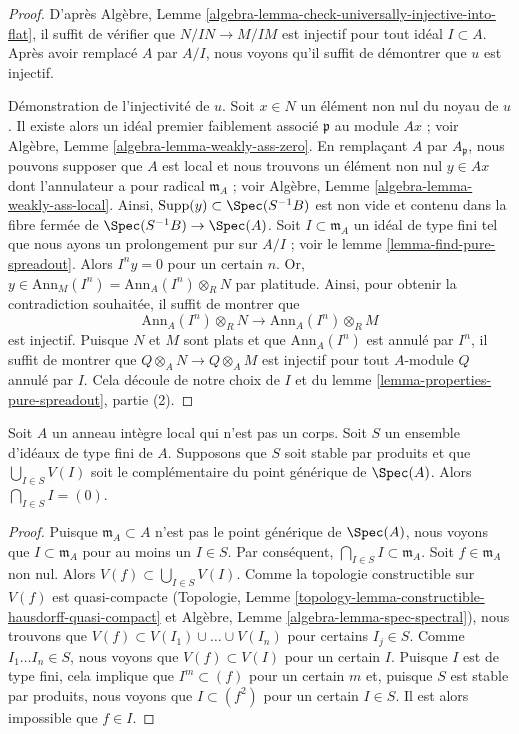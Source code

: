 \begin{proof}
D'après Algèbre, Lemme \ref{algebra-lemma-check-universally-injective-into-flat},
il suffit de vérifier que $N/IN \to M/IM$ est injectif pour tout
idéal $I \subset A$. Après avoir remplacé $A$ par $A/I$, nous voyons qu'il suffit
de démontrer que $u$ est injectif.

\medskip\noindent
Démonstration de l'injectivité de $u$. Soit $x \in N$ un élément non nul du
noyau de $u$. Il existe alors un idéal premier faiblement associé $\mathfrak p$
au module $Ax$ ; voir Algèbre, Lemme \ref{algebra-lemma-weakly-ass-zero}.
En remplaçant $A$ par $A_\mathfrak p$, nous pouvons supposer que $A$ est local et
nous trouvons un élément non nul $y \in Ax$ dont l'annulateur a pour radical
$\mathfrak m_A$ ; voir
Algèbre, Lemme \ref{algebra-lemma-weakly-ass-local}.
Ainsi, $\text{Supp}(y) \subset \Spec(S^{-1}B)$ est non vide et
contenu dans la fibre fermée de $\Spec(S^{-1}B) \to \Spec(A)$.
Soit $I \subset \mathfrak m_A$ un
idéal de type fini tel que nous ayons un prolongement pur sur $A/I$ ; voir le
lemme \ref{lemma-find-pure-spreadout}. Alors $I^n y = 0$ pour un certain $n$. Or,
$y \in \text{Ann}_M(I^n) = \text{Ann}_A(I^n) \otimes_R N$ par platitude.
Ainsi, pour obtenir la contradiction souhaitée, il suffit de montrer que
$$
\text{Ann}_A(I^n) \otimes_R N
\longrightarrow
\text{Ann}_A(I^n) \otimes_R M
$$
est injectif. Puisque $N$ et $M$ sont plats et que $\text{Ann}_A(I^n)$
est annulé par $I^n$, il suffit de montrer que
$Q \otimes_A N \to Q \otimes_A M$ est injectif pour tout $A$-module
$Q$ annulé par $I$. Cela découle de notre choix de $I$ et du
lemme \ref{lemma-properties-pure-spreadout}, partie (2).
\end{proof}

\begin{lemma}
\label{lemma-big-intersection-is-zero}
Soit $A$ un anneau intègre local qui n'est pas un corps.
Soit $S$ un ensemble d'idéaux de type fini de $A$.
Supposons que $S$ soit stable par produits et que
$\bigcup_{I \in S} V(I)$ soit le complémentaire du point générique de $\Spec(A)$.
Alors $\bigcap_{I \in S} I = (0)$.
\end{lemma}

\begin{proof}
Puisque $\mathfrak m_A \subset A$ n'est pas le point générique de $\Spec(A)$,
nous voyons que $I \subset \mathfrak m_A$ pour au moins un $I \in S$.
Par conséquent, $\bigcap_{I \in S} I \subset \mathfrak m_A$.
Soit $f \in \mathfrak m_A$ non nul. Alors
$V(f) \subset \bigcup_{I \in S} V(I)$.
Comme la topologie constructible sur $V(f)$ est quasi-compacte
(Topologie, Lemme \ref{topology-lemma-constructible-hausdorff-quasi-compact}
et
Algèbre, Lemme \ref{algebra-lemma-spec-spectral}),
nous trouvons que $V(f) \subset V(I_1) \cup \ldots \cup V(I_n)$
pour certains $I_j \in S$. Comme $I_1 \ldots I_n \in S$, nous voyons que
$V(f) \subset V(I)$ pour un certain $I$. Puisque $I$ est de type fini,
cela implique que $I^m \subset (f)$ pour un certain $m$ et, puisque
$S$ est stable par produits, nous voyons que $I \subset (f^2)$ pour
un certain $I \in S$. Il est alors impossible que $f \in I$.
\end{proof}


